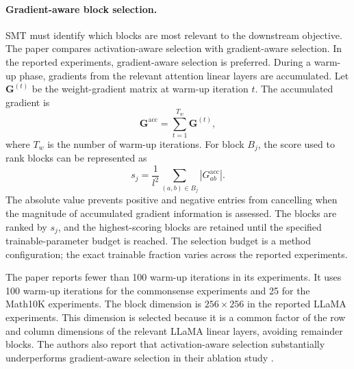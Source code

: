 \paragraph{Gradient-aware block selection.}
SMT must identify which blocks are most relevant to the downstream objective.
The paper compares activation-aware selection with gradient-aware selection.
In the reported experiments, gradient-aware selection is preferred. During
a warm-up phase, gradients from the relevant attention linear layers are
accumulated. Let $\mathbf{G}^{(t)}$ be the weight-gradient matrix at warm-up
iteration $t$. The accumulated gradient is
\begin{equation}
    \mathbf{G}^{\mathrm{acc}}
    =
    \sum_{t=1}^{T_w}\mathbf{G}^{(t)},
    \label{eq:smt-accumulated-gradient}
\end{equation}
where $T_w$ is the number of warm-up iterations. For block $B_j$, the score
used to rank blocks can be represented as
\begin{equation}
    s_j
    =
    \frac{1}{l^2}
    \sum_{(a,b)\in B_j}
    \left|G^{\mathrm{acc}}_{ab}\right|.
    \label{eq:smt-block-score}
\end{equation}
The absolute value prevents positive and negative entries from cancelling
when the magnitude of accumulated gradient information is assessed. The
blocks are ranked by $s_j$, and the highest-scoring blocks are retained until
the specified trainable-parameter budget is reached. The selection budget is
a method configuration; the exact trainable fraction varies across the
reported experiments.

The paper reports fewer than 100 warm-up iterations in its experiments. It
uses 100 warm-up iterations for the commonsense experiments and 25 for the
Math10K experiments. The block dimension is $256\times256$ in the reported
LLaMA experiments. This dimension is selected because it is a common factor
of the row and column dimensions of the relevant LLaMA linear layers, avoiding
remainder blocks. The authors also report that activation-aware selection
substantially underperforms gradient-aware selection in their ablation study
\parencite{he2025smt}.

